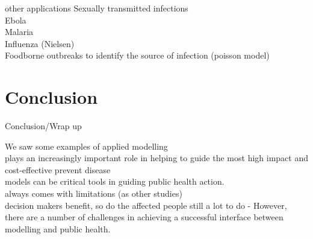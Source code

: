 \documentclass[table]{beamer}\usepackage[]{graphicx}\usepackage[]{color}
\begin{document}
\begin{frame}[fragile]{other applications}
Sexually transmitted infections \\
Ebola \\
Malaria \\

Influenza (Nielsen) \cite{nielsen2019} \\
Foodborne outbreaks to identify the source of infection (poisson model)

\end{frame}

\section{Conclusion}
\begin{frame}[fragile]{Conclusion/Wrap up}



We saw some examples of applied modelling\\
plays an increasingly important role in helping to guide the most high impact and cost-effective prevent disease\\
models can be critical tools in guiding public health action.\\


always comes with limitations (as other studies)\\
decision makers benefit, so do the affected people
still a lot to do - However, there are a number of challenges in achieving a successful interface between modelling and public health.


\end{frame}
\end{document}

